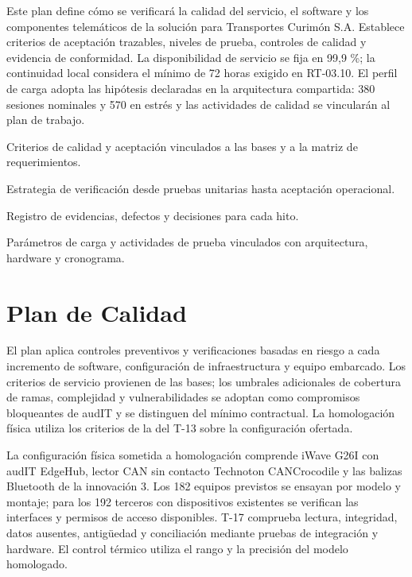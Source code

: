 
\begin{resumenApertura}
Este plan define cómo se verificará la calidad del servicio, el software y los componentes telemáticos de la solución para Transportes Curimón S.A. Establece criterios de aceptación trazables, niveles de prueba, controles de calidad y evidencia de conformidad. La disponibilidad de servicio se fija en 99,9 \%; la continuidad local considera el mínimo de 72 horas exigido en RT-03.10. El perfil de carga adopta las hipótesis declaradas en la arquitectura compartida: 380 sesiones nominales y 570 en estrés y las actividades de calidad se vincularán al plan de trabajo.
\begin{recibe}
  \item Criterios de calidad y aceptación vinculados a las bases y a la matriz de requerimientos.
  \item Estrategia de verificación desde pruebas unitarias hasta aceptación operacional.
  \item Registro de evidencias, defectos y decisiones para cada hito.
  \item Parámetros de carga y actividades de prueba vinculados con arquitectura, hardware y cronograma.
\end{recibe}
\end{resumenApertura}

\section{Plan de Calidad}\label{sec:9-plan-calidad}

El plan aplica controles preventivos y verificaciones basadas en riesgo a cada incremento de software, configuración de infraestructura y equipo embarcado. Los criterios de servicio provienen de las bases; los umbrales adicionales de cobertura de ramas, complejidad y vulnerabilidades se adoptan como compromisos bloqueantes de audIT y se distinguen del mínimo contractual. La homologación física utiliza los criterios de la  del T-13 sobre la configuración ofertada.


La configuración física sometida a homologación comprende iWave G26I con audIT EdgeHub, lector CAN sin contacto Technoton CANCrocodile y las balizas Bluetooth de la innovación 3. Los 182 equipos previstos se ensayan por modelo y montaje; para los 192 terceros con dispositivos existentes se verifican las interfaces y permisos de acceso disponibles. T-17 comprueba lectura, integridad, datos ausentes, antigüedad y conciliación mediante pruebas de integración y hardware. El control térmico utiliza el rango y la precisión del modelo homologado.

